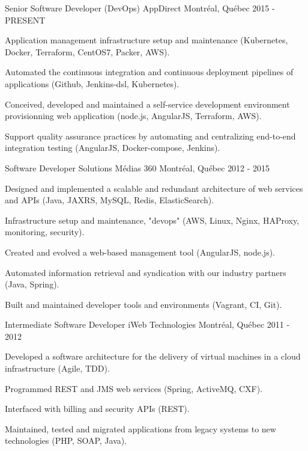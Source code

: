 
\begin{cventries}

  \cventry
    {Senior Software Developer (DevOps)} %
    {AppDirect} %
    {Montréal, Québec} %
    {2015 - PRESENT} %
    {
      \begin{cvitems} %
        \item {Application management infrastructure setup and maintenance (Kubernetes, Docker, Terraform, CentOS7, Packer, AWS).}
        \item {Automated the continuous integration and continuous deployment pipelines of applications (Github, Jenkins-dsl, Kubernetes).}
        \item {Conceived, developed and maintained a self-service development environment provisionning web application (node.js, AngularJS, Terraform, AWS).}
        \item {Support quality assurance practices by automating and centralizing end-to-end integration testing (AngularJS, Docker-compose, Jenkins).}
      \end{cvitems}
    }

  \cventry
    {Software Developer} %
    {Solutions Médias 360} %
    {Montréal, Québec} %
    {2012 - 2015} %
    {
      \begin{cvitems} %
        \item {Designed and implemented a scalable and redundant architecture of web services and APIs (Java, JAXRS, MySQL, Redis, ElasticSearch).}
        \item {Infrastructure setup and maintenance, "devops" (AWS, Linux, Nginx, HAProxy, monitoring, security).}
        \item {Created and evolved a web-based management tool (AngularJS, node.js).}
        \item {Automated information retrieval and syndication with our industry partners (Java, Spring).}
        \item {Built and maintained developer tools and environments (Vagrant, CI, Git).}
      \end{cvitems}
    }

  \cventry
    {Intermediate Software Developer} %
    {iWeb Technologies} %
    {Montréal, Québec} %
    {2011 - 2012} %
    {
      \begin{cvitems} %
        \item {Developed a software architecture for the delivery of virtual machines in a cloud infrastructure (Agile, TDD).}
        \item {Programmed REST and JMS web services (Spring, ActiveMQ, CXF).}
        \item {Interfaced with billing and security APIs (REST).}
        \item {Maintained, tested and migrated applications from legacy systems to new technologies (PHP, SOAP, Java).}
      \end{cvitems}
    }


\end{cventries}
